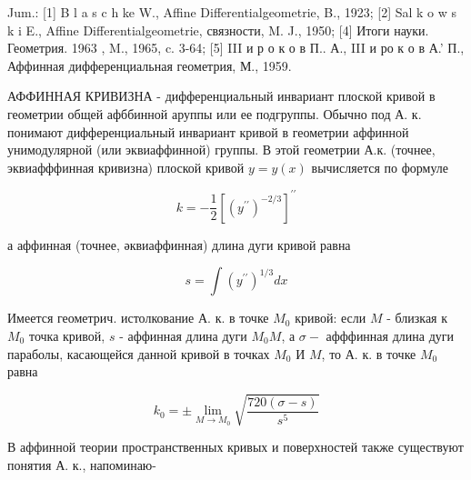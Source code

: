 \documentclass[10pt]{article}
\begin{document}
Jum.: [1] B l a s c h ke W., Affine Differentialgeometrie, B., 1923; [2] Sal k o w s k i E., Affine Differentialgeometrie, связности, M. J., 1950; [4] Итоги науки. Геометрия. 1963 , M., 1965, c. 3-64; [5] III и р о к о в П.. А., III и ро к о в А.' П., Аффинная дифференциальная геометрия, М., 1959.



АФФИННАЯ КРИВИЗНА - дифференциальный инвариант плоской кривой в геометрии общей афббинной аруппы или ее подгруппы. Обычно под А. к. понимают дифференциальный инвариант кривой в геометрии аффинной унимодулярной (или эквиаффинной) группы. В этой геометрии А.к. (точнее, эквиафффинная кривизна) плоской кривой $y=y(x)$ вычисляется по формуле



\[

k=-\frac{1}{2}\left[\left(y^{\prime \prime}\right)^{-2 / 3}\right]^{\prime \prime}

\]



а аффинная (точнее, әквиаффинная) длина дуги кривой равна



\[

s=\int\left(y^{\prime \prime}\right)^{1 / 3} d x

\]



Имеется геометрич. истолкование А. к. в точке $M_{0}$ кривой: если $M$ - близкая к $M_{0}$ точка кривой, $s$ - аффинная длина дуги $M_{0} M$, а $\sigma-$ афффинная длина дуги параболы, касающейся данной кривой в точках $M_{0}$ И $M$, то А. к. в точке $M_{0}$ равна



\[

k_{0}= \pm \lim _{M \rightarrow M_{0}} \sqrt{\frac{720(\sigma-s)}{s^{5}}}

\]



В аффинной теории пространственных кривых и поверхностей также существуют понятия А. к., напоминаю-
\end{document}
